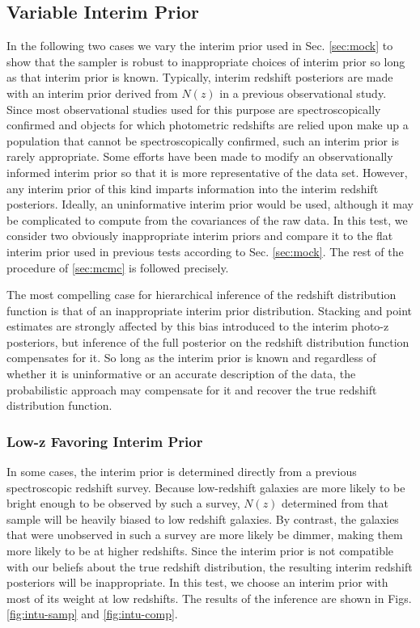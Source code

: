 \documentclass[preprint]{aastex}
\begin{document}
\clearpage
\subsection{Variable Interim Prior}
\label{sec:interim}

In the following two cases we vary the interim prior used in Sec. 
\ref{sec:mock} to show that the sampler is robust to inappropriate choices of 
interim prior so long as that interim prior is known.  Typically, interim 
redshift posteriors are made with an interim prior derived from $N(z)$ in a 
previous observational study.  Since most observational studies used for this 
purpose are spectroscopically confirmed and objects for which photometric 
redshifts are relied upon make up a population that cannot be spectroscopically 
confirmed, such an interim prior is rarely appropriate.  Some efforts have been 
made to modify an observationally informed interim prior so that it is more 
representative of the data set.  \citep{Sheldon2012}  However, any interim 
prior of this kind imparts information into the interim redshift posteriors.  
Ideally, an uninformative interim prior would be used, although it may be 
complicated to compute from the covariances of the raw data.  In this test, we 
consider two obviously inappropriate interim priors and compare it to the flat 
interim prior used in previous tests according to Sec. \ref{sec:mock}.  The 
rest of the procedure of \ref{sec:mcmc} is followed precisely.

The most compelling case for hierarchical inference of the redshift 
distribution function is that of an inappropriate interim prior distribution.  
Stacking and point estimates are strongly affected by this bias introduced to 
the interim photo-z posteriors, but inference of the full posterior on the 
redshift distribution function compensates for it.  So long as the interim 
prior is known and regardless of whether it is uninformative or an accurate 
description of the data, the probabilistic approach may compensate for it and 
recover the true redshift distribution function.

\subsubsection{Low-z Favoring Interim Prior}
\label{sec:lowz}

In some cases, the interim prior is determined directly from a previous 
spectroscopic redshift survey.  Because low-redshift galaxies are more likely 
to be bright enough to be observed by such a survey, $N(z)$ determined from 
that sample will be heavily biased to low redshift galaxies.  By contrast, the 
galaxies that were unobserved in such a survey are more likely be dimmer, 
making them more likely to be at higher redshifts.  Since the interim prior is 
not compatible with our beliefs about the true redshift distribution, the 
resulting interim redshift posteriors will be inappropriate.  In this test, we 
choose an interim prior with most of its weight at low redshifts.  The results 
of the inference are shown in Figs. \ref{fig:intu-samp} and \ref{fig:intu-comp}.
\end{document}
